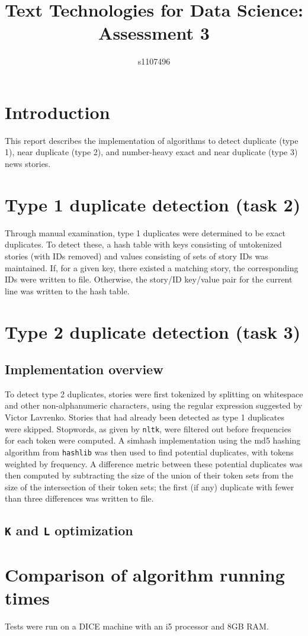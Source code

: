 \documentclass{article}
\begin{document}
\title{Text Technologies for Data Science: Assessment 3}
\author{s1107496}

\maketitle

\section{Introduction}
This report describes the implementation of algorithms to detect duplicate (type 1), near duplicate (type 2), and number-heavy exact and near duplicate (type 3) news stories.

\section{Type 1 duplicate detection (task 2)}
Through manual examination, type 1 duplicates were determined to be exact duplicates. To detect these, a hash table with keys consisting of untokenized stories (with IDs removed) and values consisting of sets of story IDs was maintained. If, for a given key, there existed a matching story, the corresponding IDs were written to file. Otherwise, the story/ID key/value pair for the current line was written to the hash table.

\section{Type 2 duplicate detection (task 3)}
\subsection{Implementation overview}
To detect type 2 duplicates, stories were first tokenized by splitting on whitespace and other non-alphanumeric characters, using the regular expression suggested by Victor Lavrenko. Stories that had already been detected as type 1 duplicates were skipped. Stopwords, as given by \texttt{nltk}, were filtered out before frequencies for each token were computed. A simhash implementation using the md5 hashing algorithm from \texttt{hashlib} was then used to find potential duplicates, with tokens weighted by frequency. A difference metric between these potential duplicates was then computed by subtracting the size of the union of their token sets from the size of the intersection of their token sets; the first (if any) duplicate with fewer than three differences was written to file.
\subsection{\texttt{K} and \texttt{L} optimization}

\section{Comparison of algorithm running times}
Tests were run on a DICE machine with an i5 processor and 8GB RAM.
%
\end{document}
